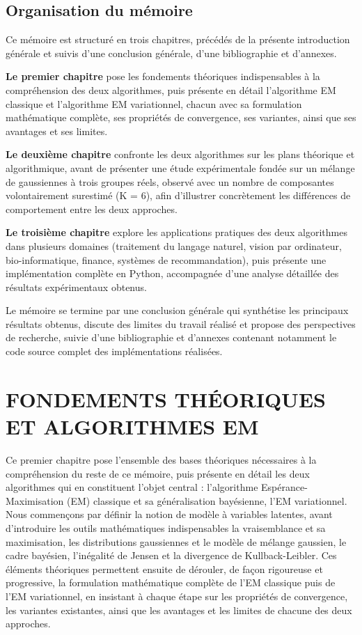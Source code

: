 \section*{Organisation du mémoire}
Ce mémoire est structuré en trois chapitres, précédés de la présente introduction générale et suivis d'une conclusion générale, d'une bibliographie et d'annexes.

\textbf{Le premier chapitre} pose les fondements théoriques indispensables à la compréhension des deux algorithmes, puis présente en détail l'algorithme EM classique et l'algorithme EM variationnel, chacun avec sa formulation mathématique complète, ses propriétés de convergence, ses variantes, ainsi que ses avantages et ses limites.

\textbf{Le deuxième chapitre} confronte les deux algorithmes sur les plans théorique et algorithmique, avant de présenter une étude expérimentale fondée sur un mélange de gaussiennes à trois groupes réels, observé avec un nombre de composantes volontairement surestimé (K = 6), afin d'illustrer concrètement les différences de comportement entre les deux approches.

\textbf{Le troisième chapitre} explore les applications pratiques des deux algorithmes dans plusieurs domaines (traitement du langage naturel, vision par ordinateur, bio-informatique, finance, systèmes de recommandation), puis présente une implémentation complète en Python, accompagnée d'une analyse détaillée des résultats expérimentaux obtenus.

Le mémoire se termine par une conclusion générale qui synthétise les principaux résultats obtenus, discute des limites du travail réalisé et propose des perspectives de recherche, suivie d'une bibliographie et d'annexes contenant notamment le code source complet des implémentations réalisées.


\chapter{FONDEMENTS THÉORIQUES ET ALGORITHMES EM}
Ce premier chapitre pose l'ensemble des bases théoriques nécessaires à la compréhension du reste de ce mémoire, puis présente en détail les deux algorithmes qui en constituent l'objet central : l'algorithme Espérance-Maximisation (EM) classique et sa généralisation bayésienne, l'EM variationnel. Nous commençons par définir la notion de modèle à variables latentes, avant d'introduire les outils mathématiques indispensables  la vraisemblance et sa maximisation, les distributions gaussiennes et le modèle de mélange gaussien, le cadre bayésien, l'inégalité de Jensen et la divergence de Kullback-Leibler. Ces éléments théoriques permettent ensuite de dérouler, de façon rigoureuse et progressive, la formulation mathématique complète de l'EM classique puis de l'EM variationnel, en insistant à chaque étape sur les propriétés de convergence, les variantes existantes, ainsi que les avantages et les limites de chacune des deux approches.

